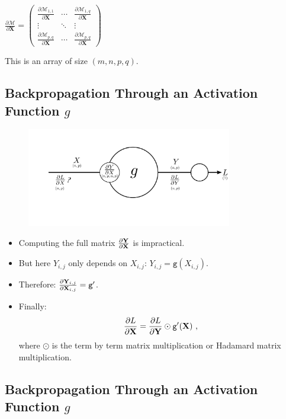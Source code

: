 \documentclass{book}
\newcommand{\X}{\mathbf{X}}
\newcommand{\Y}{\mathbf{Y}}
\newcommand{\act}{\texttt{g}}%
\newcommand{\loss}{L}
\begin{document}
\begin{block}{}
\centering
$\frac{\partial \mathcal{M}}{\partial \X} =
\begin{pmatrix}
\frac{\partial \mathcal{M}_{1,1}}{\partial \X} & \cdots & \frac{\partial \mathcal{M}_{1,q}}{\partial \X} \\
\vdots & \ddots & \vdots \\
\frac{\partial \mathcal{M}_{p,q}}{\partial \X} & \cdots & \frac{\partial \mathcal{M}_{p,q}}{\partial \X}
\end{pmatrix}
$

\end{block}

This is an array of size $(m, n, p, q)$.

\subsection{Backpropagation Through an Activation Function $g$}

\begin{figure}[h]
    \centering
    \includegraphics[width=0.8\textwidth]{bp_activation.png}
\end{figure}

\begin{itemize}
\item Computing the full matrix $\pdv{\Y}{\X}$ is impractical.
\item But here $Y_{i,j}$ only depends on $X_{i,j}$: $Y_{i,j} = \act(X_{i,j})$.
\item Therefore: $\pdv{\Y_{i,j}}{\X_{i,j}} = \act'$.
\item Finally:
\[
\pdv{\loss}{\X} = \pdv{\loss}{\Y} \odot \act'(\X) \text{ ,}
\]
where $\odot$ is the term by term matrix multiplication or Hadamard matrix multiplication.
\end{itemize}

\subsection{Backpropagation Through an Activation Function $g$}
\end{document}
